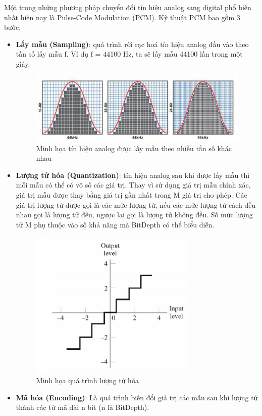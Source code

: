 Một trong những phương pháp chuyển đổi tín hiệu analog sang digital phổ biến nhất hiện nay là Pulse-Code Modulation (PCM).
Kỹ thuật PCM bao gồm 3 bước:
\begin{itemize}
	\item \textbf{Lấy mẫu (Sampling)}: quá trình rời rạc hoá tín hiệu analog đầu vào theo tần số lấy mẫu f. Ví dụ f = 44100 Hz, ta sẽ lấy mẫu 44100 lần trong một giây.
	\begin{figure}[h]
		\centering
		\includegraphics[scale=1]{sampling}
		\caption{Minh họa tín hiệu analog được lấy mẫu theo nhiều tần số khác nhau}
		\label{fig:c2_sampling}
	\end{figure}
	\item \textbf{Lượng tử hóa (Quantization)}: tín hiệu analog sau khi được lấy mẫu thì mỗi mẫu có thể có vô số các giá trị. Thay vì sử dụng giá trị mẫu chính xác, giá trị mẫu được thay bằng giá trị gần nhất trong M giá trị cho phép. Các giá trị lượng tử được gọi là các mức lượng tử, nếu các mức lượng tử cách đều nhau gọi là lượng tử đều, ngược lại gọi là lượng tử không đều. Số mức lượng tử M phụ thuộc vào số khả năng mà BitDepth có thể biểu diễn.
	\begin{figure}[h]
		\centering
		\includegraphics[scale=1]{quantization}
		\caption{Minh họa quá trình lượng tử hóa}
		\label{fig:c2_quantization}
	\end{figure}
	\item \textbf{Mã hóa (Encoding)}: Là quá trình biến đổi giá trị các mẫu sau khi lượng tử thành các từ mã dài n bit (n là BitDepth).
\end{itemize}

